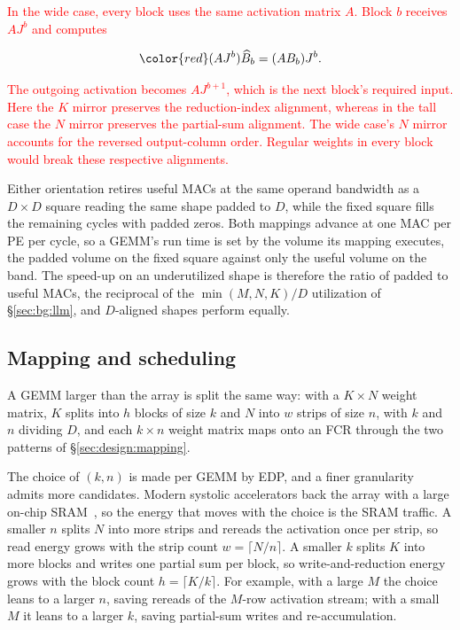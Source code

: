\begingroup
\textcolor{red}{In the wide case, every block uses the same activation matrix $A$.
Block $b$ receives $AJ^b$ and computes}

\begin{equation}
\color{red}
 (AJ^b)\widehat B_b=(AB_b)J^b.
 \label{eq:wide-invariant}
\end{equation}

\textcolor{red}{The outgoing activation becomes $AJ^{b+1}$, which is the next block's
required input. Here the $K$ mirror preserves the reduction-index
alignment, whereas in the tall case the $N$ mirror preserves the
partial-sum alignment. The wide case's $N$ mirror accounts for the
reversed output-column order. Regular weights in every block would
break these respective alignments.}
\par
\endgroup

Either orientation retires useful MACs at the same operand bandwidth
as a $D{\times}D$ square reading the same shape padded to $D$, while the
fixed square fills the remaining cycles with padded zeros. Both
mappings advance at one MAC per PE per cycle, so a GEMM's run time
is set by the volume its mapping executes, the padded volume on the
fixed square against only the useful volume on the band. The
speed-up on an underutilized shape is therefore the ratio of padded
to useful MACs, the reciprocal of the $\min(M,N,K)/D$ utilization of
\S\ref{sec:bg:llm}, and $D$-aligned shapes perform equally.

\subsection{Mapping and scheduling}
\label{sec:design:batch}
\label{sec:design:modes}
\label{sec:design:algo}

A GEMM larger than the array is split the same way: with a
$K{\times}N$ weight matrix, $K$ splits
into $h$ blocks of size $k$ and $N$ into $w$ strips of size $n$,
with $k$ and $n$ dividing $D$, and each $k{\times}n$ weight matrix maps
onto an FCR through the two patterns of
\S\ref{sec:design:mapping}.

The choice of $(k,n)$ is made per GEMM by EDP, and a finer
granularity admits more candidates. Modern systolic accelerators
back the array with a large on-chip SRAM~\cite{jouppi2023tpu},
so the energy that moves with the choice is the SRAM traffic. A
smaller $n$ splits $N$ into more strips and rereads the activation
once per strip, so read energy grows with the strip count
$w{=}\lceil N/n\rceil$. A smaller $k$ splits $K$ into more blocks
and writes one partial sum per block, so write-and-reduction
energy grows with the block count $h{=}\lceil K/k\rceil$. For
example, with a large $M$ the choice leans to a larger $n$, saving
rereads of the $M$-row activation stream; with a small $M$ it
leans to a larger $k$, saving partial-sum writes and
re-accumulation.

